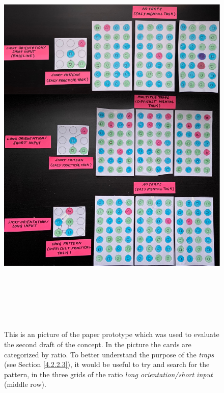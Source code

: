 \begin{figure}[t!]
\centering
\includegraphics[width=15cm, height=20cm]{Chapters/graphics/paperprototype.PNG}
\caption{This is an picture of the paper prototype which was used to evaluate the second draft of the concept. In the picture the cards are categorized by ratio. To better understand the purpose of the \textit{traps} (see Section \ref{4.2.2.3}), it would be useful to try and search for the pattern, in the three grids of the ratio \textit{long orientation/short input} (middle row).}
\label{fig:paperprototype}
\end{figure}

